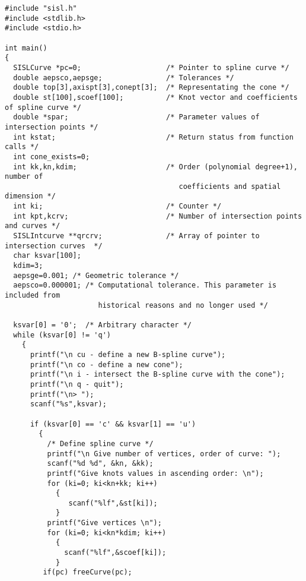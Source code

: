 \begin{verbatim}
#include "sisl.h"
#include <stdlib.h>  
#include <stdio.h>

int main()
{
  SISLCurve *pc=0;                    /* Pointer to spline curve */
  double aepsco,aepsge;               /* Tolerances */
  double top[3],axispt[3],conept[3];  /* Representating the cone */
  double st[100],scoef[100];          /* Knot vector and coefficients of spline curve */
  double *spar;                       /* Parameter values of intersection points */
  int kstat;                          /* Return status from function calls */
  int cone_exists=0;
  int kk,kn,kdim;                     /* Order (polynomial degree+1), number of 
                                         coefficients and spatial dimension */
  int ki;                             /* Counter */
  int kpt,kcrv;                       /* Number of intersection points and curves */
  SISLIntcurve **qrcrv;               /* Array of pointer to intersection curves  */
  char ksvar[100];                    
  kdim=3;
  aepsge=0.001; /* Geometric tolerance */
  aepsco=0.000001; /* Computational tolerance. This parameter is included from 
                      historical reasons and no longer used */

  ksvar[0] = '0';  /* Arbitrary character */
  while (ksvar[0] != 'q')
    {
      printf("\n cu - define a new B-spline curve");
      printf("\n co - define a new cone");
      printf("\n i - intersect the B-spline curve with the cone");
      printf("\n q - quit");
      printf("\n> ");
      scanf("%s",ksvar);

      if (ksvar[0] == 'c' && ksvar[1] == 'u')
        {
          /* Define spline curve */
          printf("\n Give number of vertices, order of curve: ");
          scanf("%d %d", &kn, &kk);
          printf("Give knots values in ascending order: \n");
          for (ki=0; ki<kn+kk; ki++)
            {
               scanf("%lf",&st[ki]);
            }
          printf("Give vertices \n");
          for (ki=0; ki<kn*kdim; ki++)
            {
              scanf("%lf",&scoef[ki]);
            }
         if(pc) freeCurve(pc);


\end{verbatim}
